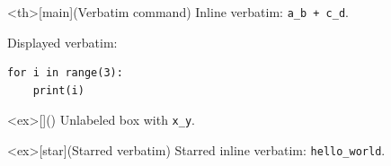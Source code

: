 \documentclass{article}
\begin{document}

\begin{statementspverb}<th>[main](Verbatim command)
Inline verbatim: \verb|a_b + c_d|.

Displayed verbatim:
\begin{verbatim}
for i in range(3):
    print(i)
\end{verbatim}
\end{statementspverb}


\begin{statementspverb}<ex>[]()
Unlabeled box with \verb|x_y|.
\end{statementspverb}

\begin{statementspverb*}<ex>[star](Starred verbatim)
Starred inline verbatim: \verb|hello_world|.
\end{statementspverb*}

\end{document}
